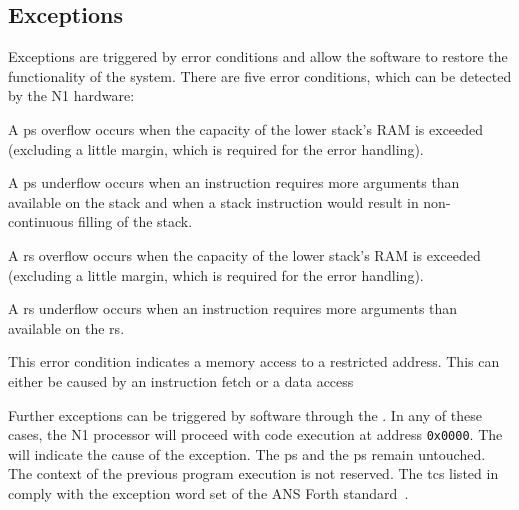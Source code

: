 \subsection{Exceptions}
\label{reset:excpt}
Exceptions are triggered by error conditions and allow the software to restore the functionality
of the system. There are five error conditions, which can be detected by the N1 hardware:
\begin{description}[style=nextline]
\item[\Gls{ps} overflow]
  A \gls{ps} overflow occurs when the capacity of the lower stack's RAM is exceeded
  (excluding a little margin, which is required for the error handling). 
\item[\Gls{rs} stack underflow]
  A \gls{ps} underflow occurs when an instruction requires more arguments than
  available on the \gls{stack} and when a stack instruction would result in non-continuous filling
  of the stack.
\item[\Gls{rs} overflow]
  A \gls{rs} overflow occurs when the capacity of the lower stack's RAM is exceeded
  (excluding a little margin, which is required for the error handling). 
\item[\Gls{rs} underflow]
  A \gls{rs} underflow occurs when an instruction requires more arguments than
  available on the \gls{rs}.
\item[Address out of range]
  This error condition indicates a memory access to a restricted address. This can either
  be caused by an instruction fetch or a data access
\end{description}
Further exceptions can be triggered by software through the .
In any of these cases, the N1 processor will proceed with code execution at address \texttt{0x0000}.
The  will indicate the cause of the exception.
The \gls{ps} and the \gls{ps} remain untouched.
The context of the previous program execution is not reserved.
The \glspl{tc} listed in  comply with the exception word set of
the ANS Forth standard~\cite{dpans94}.

